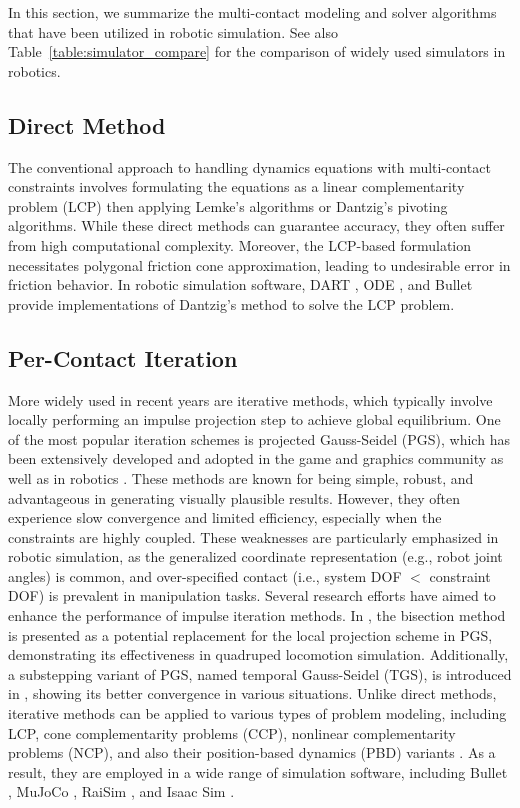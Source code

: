 \documentclass[lettersize,journal]{IEEEtran}
\begin{document}
In this section, we summarize the multi-contact modeling and solver algorithms that have been utilized in robotic simulation. See also Table~\ref{table:simulator_compare} for the comparison of widely used simulators in robotics.

\subsection{Direct Method}
The conventional approach to handling dynamics equations with multi-contact constraints involves formulating the equations as a linear complementarity problem (LCP) \cite{potra1997formulating} then applying Lemke's algorithms \cite{llyod2005fast} or Dantzig's pivoting algorithms. 
While these direct methods can guarantee accuracy, they often suffer from high computational complexity. Moreover, the LCP-based formulation necessitates polygonal friction cone approximation, leading to undesirable error in friction behavior. 
In robotic simulation software, DART \cite{lee2018dart}, ODE \cite{ode}, and Bullet \cite{bullet} provide implementations of Dantzig's method to solve the LCP problem.

\subsection{Per-Contact Iteration}

More widely used in recent years are iterative methods, which typically involve locally performing an impulse projection step to achieve global equilibrium. 
One of the most popular iteration schemes is projected Gauss-Seidel (PGS), which has been extensively developed and adopted in the game and graphics community \cite{macklin2014unified,macklin2016xpbd} as well as in robotics \cite{todorov2014convex,horak2019similarities}. 
These methods are known for being simple, robust, and advantageous in generating visually plausible results. 
However, they often experience slow convergence and limited efficiency, especially when the constraints are highly coupled. 
These weaknesses are particularly emphasized in robotic simulation, as the generalized coordinate representation (e.g., robot joint angles) is common, and over-specified contact (i.e., system DOF $<$ constraint DOF) is prevalent in manipulation tasks.
Several research efforts have aimed to enhance the performance of impulse iteration methods. In \cite{hwangbo2018per}, the bisection method is presented as a potential replacement for the local projection scheme in PGS, demonstrating its effectiveness in quadruped locomotion simulation. Additionally, a substepping variant of PGS, named temporal Gauss-Seidel (TGS), is introduced in \cite{macklin2019small}, showing its better convergence in various situations.
Unlike direct methods, iterative methods can be applied to various types of problem modeling, including LCP, cone complementarity problems (CCP), nonlinear complementarity problems (NCP), and also their position-based dynamics (PBD) variants \cite{muller2020detailed}. 
As a result, they are employed in a wide range of simulation software, including Bullet \cite{bullet}, MuJoCo \cite{mujoco}, RaiSim \cite{RaiSim}, and Isaac Sim \cite{makoviychuk2021isaac}.
\end{document}
